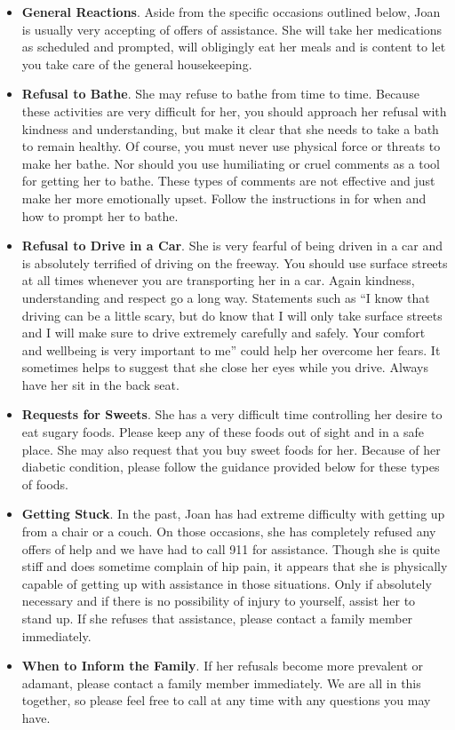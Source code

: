 \documentclass[]{article}
\begin{document}
\begin{itemize}
	\item \textbf{General Reactions}. Aside from the specific occasions outlined below, Joan is usually very accepting of offers of assistance. She will take her medications as scheduled and prompted, will obligingly eat her meals and is content to let you take care of the general housekeeping.
	\item \textbf{Refusal to Bathe}. She may refuse to bathe from time to time. Because these activities are very difficult for her, you should approach her refusal with kindness and understanding, but make it clear that she needs to take a bath to remain healthy. Of course, you must never use physical force or threats to make her bathe. Nor should you use humiliating or cruel comments as a tool for getting her to bathe. These types of comments are not effective and just make her more emotionally upset. Follow the instructions in \shower{} for when and how to prompt her to bathe.
	\item \textbf{Refusal to Drive in a Car}. She is very fearful of being driven in a car and is absolutely terrified of driving on the freeway.  You should use surface streets at all times whenever you are transporting her in a car. Again kindness, understanding and respect go a long way. Statements such as ``I know that driving can be a little scary, but do know that I will only take surface streets and I will make sure to drive extremely carefully and safely. Your comfort and wellbeing is very important to me'' could help her overcome her fears. It sometimes helps to suggest that she close her eyes while you drive. Always have her sit in the back seat. 
	\item \textbf{Requests for Sweets}. She has a very difficult time controlling her desire to eat sugary foods. Please keep any of these foods out of sight and in a safe place. She may also request that you buy sweet foods for her. Because of her diabetic condition, please follow the guidance provided below for these types of foods.
	\item \textbf{Getting Stuck}. In the past, Joan has had extreme difficulty with getting up from a chair or a couch. On those occasions, she has completely refused any offers of help and we have had to call 911 for assistance. Though she is quite stiff and does sometime complain of hip pain, it appears that she is physically capable of getting up with assistance in those situations. Only if absolutely necessary and if there is no possibility of injury to yourself, assist her to stand up.  If she refuses that assistance, please contact a family member immediately.
	\item \textbf{When to Inform the Family}. If her refusals become more prevalent or adamant, please contact a family member immediately. We are all in this together, so please feel free to call at any time with any questions you may have.
\end{itemize}
\end{document}
